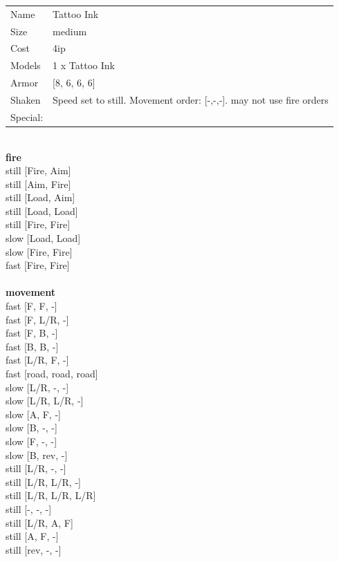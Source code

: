 \begin{tabular}{ll}
  Name & Tattoo Ink \\
  Size & medium\\
  Cost & 4ip\\
  Models & 1 x Tattoo Ink\\
  Armor & [8, 6, 6, 6]\\
  Shaken & Speed set to still. Movement order: [-,-,-]. may not use fire orders\\
  Special: \\
\end{tabular}

\noindent 

\ \\ {\bf fire } \\
still [Fire, Aim] \\
still [Aim, Fire] \\
still [Load, Aim] \\
still [Load, Load] \\
still [Fire, Fire] \\
slow [Load, Load] \\
slow [Fire, Fire] \\
fast [Fire, Fire] \\
\ \\ {\bf movement } \\
fast [F, F, -] \\
fast [F, L/R, -] \\
fast [F, B, -] \\
fast [B, B, -] \\
fast [L/R, F, -] \\
fast [road, road, road] \\
slow [L/R, -, -] \\
slow [L/R, L/R, -] \\
slow [A, F, -] \\
slow [B, -, -] \\
slow [F, -, -] \\
slow [B, rev, -] \\
still [L/R, -, -] \\
still [L/R, L/R, -] \\
still [L/R, L/R, L/R] \\
still [-, -, -] \\
still [L/R, A, F] \\
still [A, F, -] \\
still [rev, -, -] \\


